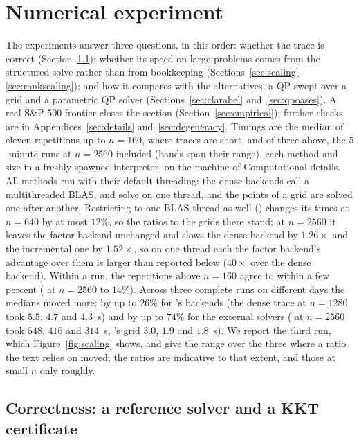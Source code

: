 \section{Numerical experiment}
\label{sec:experiment}

The experiments answer three questions, in this order: whether the trace is correct
(Section~\ref{sec:exactness}); whether its speed on large problems comes from the structured
solve rather than from bookkeeping (Sections~\ref{sec:scaling}--\ref{sec:rankscaling}); and
how it compares with the alternatives, a QP swept over a grid and a parametric QP solver
(Sections~\ref{sec:clarabel} and~\ref{sec:qpoases}). A real S\&P 500 frontier closes the section
(Section~\ref{sec:empirical}); further checks are in Appendices~\ref{sec:details} and~\ref{sec:degeneracy}. Timings are
the median of eleven repetitions up to $n = 160$, where traces are short, and of three
above, the $5$-minute  runs at $n=2560$ included (bands span their range),
each method and size in a freshly spawned interpreter, on the machine of Computational
details. All methods run with their default threading: the dense backends call a
multithreaded BLAS,  and  solve on one thread, and the points
of a grid are solved one after another. Restricting  to one BLAS thread as
well () changes its times at $n=640$ by at most $12\%$, so the ratios to
the grids there stand; at $n=2560$ it leaves the factor backend unchanged and slows the
dense backend by $1.26\times$ and the incremental one by $1.52\times$, so on one
thread each the factor backend's advantage over them is larger than reported below
($40\times$ over the dense backend). Within a run, the repetitions above $n=160$
agree to within a few percent ( at $n=2560$ to $14\%$). Across three
complete runs on different days the medians moved more: by up to $26\%$ for
's backends (the dense trace at $n=1280$ took $5.5$, $4.7$ and $4.3$~s) and
by up to $74\%$ for the external solvers ( at $n=2560$ took $548$, $416$
and $314$~s, 's grid $3.0$, $1.9$ and $1.8$~s). We report the third run,
which Figure~\ref{fig:scaling} shows, and give the range over the three where a ratio
the text relies on moved; the ratios are indicative to that extent, and those at small
$n$ only roughly.

\subsection{Correctness: a reference solver and a KKT certificate}
\label{sec:exactness}

